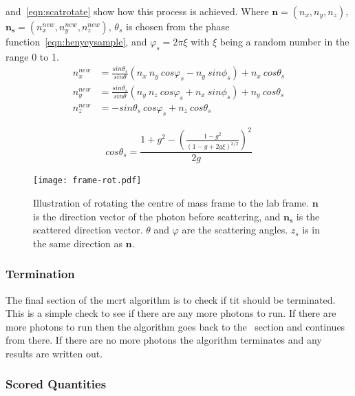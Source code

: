 \medskip

 and~\cref{eqn:scatrotate} show how this process is achieved.
Where $\mathbf{n}=(n_x,n_y,n_z)$, $\mathbf{n_s}=(n_{x}^{new},n_{y}^{new},n_{z}^{new})$, $\theta_s$ is chosen from the phase function~\cref{eqn:henyeysample}, and $\varphi_s=2\pi \xi$ with $\xi$ being a random number in the range 0 to 1.
\begin{equation}
	\begin{aligned}
		n_{x}^{new} &= \frac{sin\theta_s}{sin\theta} \left(n_x\ n_y\ cos\varphi_s - n_y\ sin\phi_s\right) + n_x\ cos\theta_s \\
		n_{y}^{new} &= \frac{sin\theta_s}{sin\theta} \left(n_y\ n_z\ cos\varphi_s + n_x\ sin\phi_s\right) + n_y\ cos\theta_s \\
		n_{z}^{new} &= -sin\theta_s\ cos\varphi_s + n_z\ cos\theta_s
	\end{aligned}
	\label{eqn:scatrotate}
\end{equation}

\begin{equation}
cos\theta_s = \frac{1+g^2-\left(\frac{1-g^2}{(1-g+2g\xi)^{3/2}}\right)^2}{2g}
\label{eqn:henyeysample}
\end{equation}


\begin{figure}[!ht]
	\centering
	\texttt{[image: frame-rot.pdf]}
	\caption{Illustration of rotating the centre of mass frame to the lab frame. $\mathbf{n}$ is the direction vector of the photon before scattering, and $\mathbf{n_s}$ is the scattered direction vector. $\theta$ and $\varphi$ are the scattering angles. $z_s$ is in the same direction as $\mathbf{n}$.}
	\label{fig:labframerotate}
\end{figure}


\subsubsection*{Termination}\label{sec:terminator}

The final section of the \gls*{mcrt} algorithm is to check if tit should be terminated. This is a simple check to see if there are any more photons to run.
If there are more photons to run then the algorithm goes back to the~ section and continues from there.
If there are no more photons the algorithm terminates and any results are written out.


\subsubsection*{Scored Quantities}\label{sec:fluencecalc}

